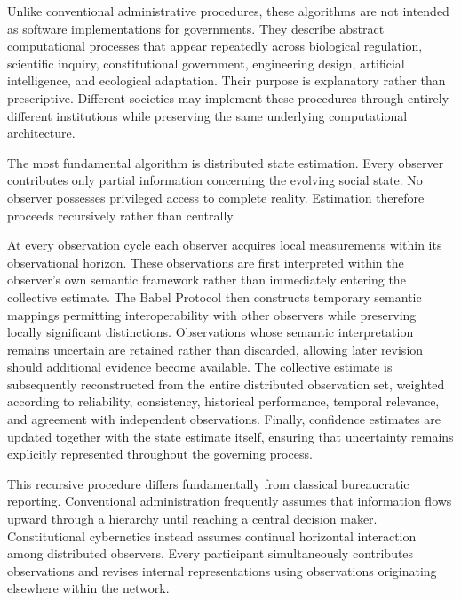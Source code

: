 \documentclass[12pt,a4paper]{article}
\begin{document}
Unlike conventional administrative procedures, these algorithms are not intended as software implementations for governments. They describe abstract computational processes that appear repeatedly across biological regulation, scientific inquiry, constitutional government, engineering design, artificial intelligence, and ecological adaptation. Their purpose is explanatory rather than prescriptive. Different societies may implement these procedures through entirely different institutions while preserving the same underlying computational architecture.

The most fundamental algorithm is distributed state estimation. Every observer contributes only partial information concerning the evolving social state. No observer possesses privileged access to complete reality. Estimation therefore proceeds recursively rather than centrally.

At every observation cycle each observer acquires local measurements within its observational horizon. These observations are first interpreted within the observer's own semantic framework rather than immediately entering the collective estimate. The Babel Protocol then constructs temporary semantic mappings permitting interoperability with other observers while preserving locally significant distinctions. Observations whose semantic interpretation remains uncertain are retained rather than discarded, allowing later revision should additional evidence become available. The collective estimate is subsequently reconstructed from the entire distributed observation set, weighted according to reliability, consistency, historical performance, temporal relevance, and agreement with independent observations. Finally, confidence estimates are updated together with the state estimate itself, ensuring that uncertainty remains explicitly represented throughout the governing process.

This recursive procedure differs fundamentally from classical bureaucratic reporting. Conventional administration frequently assumes that information flows upward through a hierarchy until reaching a central decision maker. Constitutional cybernetics instead assumes continual horizontal interaction among distributed observers. Every participant simultaneously contributes observations and revises internal representations using observations originating elsewhere within the network.
\end{document}
